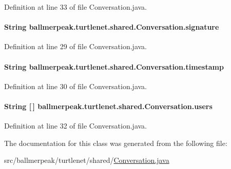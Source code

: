 Definition at line 33 of file Conversation.\-java.

\hypertarget{classballmerpeak_1_1turtlenet_1_1shared_1_1Conversation_a27bf5eadc5e4a46d79125a2c6b7be9f8}{
\paragraph[{signature}]{\setlength{\rightskip}{0pt plus 5cm}String ballmerpeak.\-turtlenet.\-shared.\-Conversation.\-signature}}\label{classballmerpeak_1_1turtlenet_1_1shared_1_1Conversation_a27bf5eadc5e4a46d79125a2c6b7be9f8}


Definition at line 29 of file Conversation.\-java.

\hypertarget{classballmerpeak_1_1turtlenet_1_1shared_1_1Conversation_a4b23ef60e0fef247b74eeba61a85036f}{
\paragraph[{timestamp}]{\setlength{\rightskip}{0pt plus 5cm}String ballmerpeak.\-turtlenet.\-shared.\-Conversation.\-timestamp}}\label{classballmerpeak_1_1turtlenet_1_1shared_1_1Conversation_a4b23ef60e0fef247b74eeba61a85036f}


Definition at line 30 of file Conversation.\-java.

\hypertarget{classballmerpeak_1_1turtlenet_1_1shared_1_1Conversation_a83edd678b2620b5487fb9a93d52b285e}{
\paragraph[{users}]{\setlength{\rightskip}{0pt plus 5cm}String \mbox{[}$\,$\mbox{]} ballmerpeak.\-turtlenet.\-shared.\-Conversation.\-users}}\label{classballmerpeak_1_1turtlenet_1_1shared_1_1Conversation_a83edd678b2620b5487fb9a93d52b285e}


Definition at line 32 of file Conversation.\-java.



The documentation for this class was generated from the following file\-:\begin{DoxyCompactItemize}
\item 
src/ballmerpeak/turtlenet/shared/\hyperlink{Conversation_8java}{Conversation.\-java}\end{DoxyCompactItemize}
